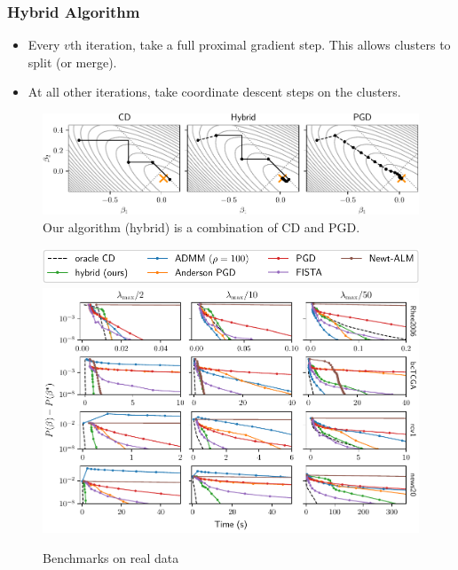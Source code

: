 \documentclass[10pt,aspectratio=169]{beamer}
\begin{document}
\begin{frame}[c]
  \frametitle{Hybrid Algorithm}

  \begin{itemize}
    \item Every \(v\)th iteration, take a full proximal gradient step.
          This allows clusters to split (or merge).
    \item At all other iterations, take coordinate descent steps on the clusters.
  \end{itemize}

  \pause

  \begin{figure}[htpb]
    \centering
    \includegraphics[width=\textwidth]{figures/illustration_solvers.pdf}
    \caption{%
      Our algorithm (hybrid) is a combination of CD and PGD.
    }
  \end{figure}

\end{frame}

\begin{frame}

  \begin{figure}[htpb]
    \centering
    \includegraphics[scale=0.6]{figures/real_legend.pdf}
    \includegraphics[scale=0.6]{figures/real.pdf}
    \caption{%
      Benchmarks on real data
    }
  \end{figure}
\end{frame}
\end{document}
